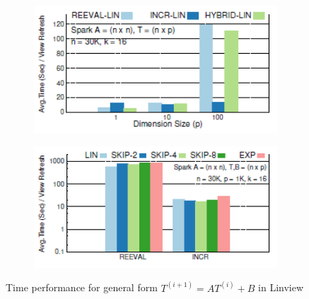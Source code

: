 
\begin{figure}
\captionsetup[subfigure]{width=1\textwidth}
     \centering
    \begin{subfigure}{0.35\textwidth}
        {\includegraphics[height = 0.8\textwidth, width=1.2\textwidth]{Figures/linview_general_exp2.png}}
        \caption{}
        \label{fig:linview_general1}
    \end{subfigure}
    \hspace{1.5cm}
    \begin{subfigure}{0.35\textwidth}
        {\includegraphics[height = 0.8\textwidth, width=1.2\textwidth]{Figures/linview_general_exp1.png}}
        \caption{}
        \label{fig:linview_general2}
    \end{subfigure}
    \caption{Time performance for general form $T^{(i+1)} = AT^{(i)} + B$ in Linview}
\end{figure}


